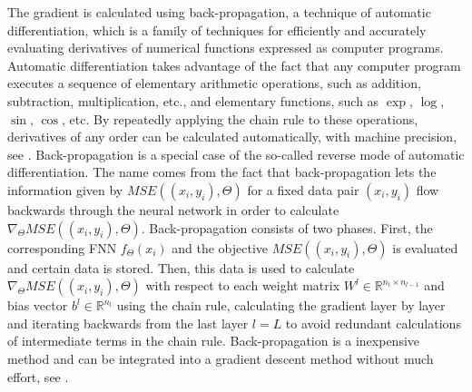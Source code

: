 The gradient is calculated using back-propagation, a technique of automatic differentiation, which is a family of techniques for efficiently and accurately evaluating derivatives of numerical functions expressed as computer programs. Automatic differentiation takes advantage of the fact that any computer program executes a sequence of elementary arithmetic operations, such as addition, subtraction, multiplication, etc., and elementary functions, such as $\exp$, $\log$, $\sin$, $\cos$, etc. By repeatedly applying the chain rule to these operations, derivatives of any order can be calculated automatically, with machine precision, see \cite{BaydinPearlmutterAndreyevich:2018}. Back-propagation is a special case of the so-called reverse mode of automatic differentiation. The name comes from the fact that back-propagation lets the information given by $MSE((x_i, y_i), \Theta)$ for a fixed data pair $(x_i, y_i)$ flow backwards through the neural network in order to calculate $\nabla_{\Theta} MSE((x_i, y_i), \Theta)$. Back-propagation consists of two phases. First, the corresponding FNN $f_{\Theta} \left(x_{i}\right)$ and the objective $MSE((x_i, y_i), \Theta)$ is evaluated and certain data is stored. Then, this data is used to calculate $\nabla_{\Theta} MSE((x_i, y_i), \Theta)$ with respect to each weight matrix $W^l \in \mathbb{R}^{n_l \times n_{l-1}}$ and bias vector $b^l \in \mathbb{R}^{n_l}$ using the chain rule, calculating the gradient layer by layer and iterating backwards from the last layer $l=L$ to avoid redundant calculations of intermediate terms in the chain rule. Back-propagation is a inexpensive method and can be integrated into a gradient descent method without much effort, see \cite[section~6.5]{GoodfellowBengioCourville:2016}.\\


